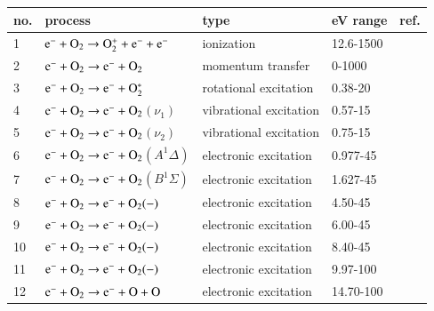 \begin{table}
  \center{}
  \begin{threeparttable}
    \label{tab:tableO2}
    \begin{tabular*}{\textwidth}{l@{\extracolsep{\fill}}llll}
    \toprule
    {no.}  & {process} & {type} &  {eV range}  &  {ref.} \\
    \midrule
      1 & $\rm e^- + O_2 \rightarrow O_2^+ + e^- + e^-$  &  ionization   &  12.6-1500 &   \cite{lxc:2024:morgan} \\ 
      \midrule     
      2 & $\rm e^- + O_2 \rightarrow e^- + O_2$  &  momentum transfer   &  0-1000  & \cite{lxc:2024:morgan}\\   
      \midrule
      3 & $\rm e^- + O_2 \rightarrow e^- + O_2^* $  &  rotational excitation   &  0.38-20 & \cite{lxc:2024:morgan}\\ 
           \midrule
      4 & $\rm e^- + O_2 \rightarrow e^- + O_2$$(\nu_1) $  &  vibrational excitation   &  0.57-15 &\cite{lxc:2024:morgan}\\  
      5 & $\rm e^- + O_2 \rightarrow e^- + O_2$$(\nu_2) $  &  vibrational excitation   &  0.75-15 &\cite{lxc:2024:morgan}\\ 
          \midrule
      6 & $\rm e^- + O_2 \rightarrow e^- + O_2$$(A^1 \Delta) $  &  electronic excitation   &  0.977-45 & \cite{lxc:2024:morgan}\\ 
      7 & $\rm e^- + O_2 \rightarrow e^- + O_2$$(B^1 \Sigma) $  &  electronic excitation   &  1.627-45 & \cite{lxc:2024:morgan}\\ 
      8 & $\rm e^- + O_2 \rightarrow e^- + O_2(-) $  &  electronic excitation   &  4.50-45 & \cite{lxc:2024:morgan}\\ 
      9 & $\rm e^- + O_2 \rightarrow e^- + O_2(-) $  &  electronic excitation   &  6.00-45 & \cite{lxc:2024:morgan}\\ 
      10 & $\rm e^- + O_2 \rightarrow e^- + O_2(-) $  &  electronic excitation   &  8.40-45 & \cite{lxc:2024:morgan}\\ 
      11 & $\rm e^- + O_2 \rightarrow e^- + O_2(-) $  &  electronic excitation   &  9.97-100 & \cite{lxc:2024:morgan}\\ 
      12 & $\rm e^- + O_2 \rightarrow e^- + O + O $  &  electronic excitation   &  14.70-100 & \cite{lxc:2024:morgan}\\ 
    \bottomrule
    \end{tabular*}

   \end{threeparttable}
\end{table}
